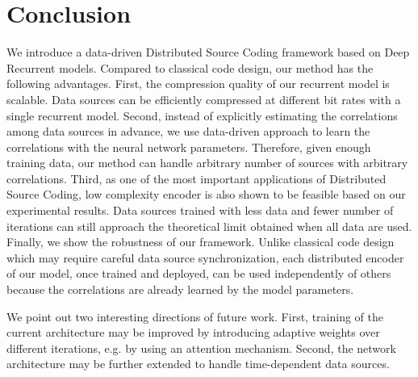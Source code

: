 \documentclass[10pt,twocolumn,letterpaper]{article}
\begin{document}
\section{Conclusion}
We introduce a data-driven Distributed Source Coding framework based on Deep Recurrent models. Compared to classical code design, our method has the following advantages. First, the compression quality of our recurrent model is scalable. Data sources can be efficiently compressed at different bit rates with a single recurrent model. Second, instead of explicitly estimating the correlations among data sources in advance, we use data-driven approach to learn the correlations with the neural network parameters. Therefore, given enough training data, our method can handle arbitrary number of sources with arbitrary correlations. Third, as one of the most important applications of Distributed Source Coding, low complexity encoder is also shown to be feasible based on our experimental results. Data sources trained with less data and fewer number of iterations can still approach the theoretical limit obtained when all data are used. Finally, we show the robustness of our framework. Unlike classical code design which may require careful data source synchronization, each distributed encoder of our model, once trained and deployed, can be used independently of others because the correlations are already learned by the model parameters. 

We point out two interesting directions of future work. First, training of the current architecture may be improved by introducing adaptive weights over different iterations, e.g. by using an attention mechanism. Second, the network architecture may be further extended to handle time-dependent data sources. %
{%
\balance


}
\end{document}
